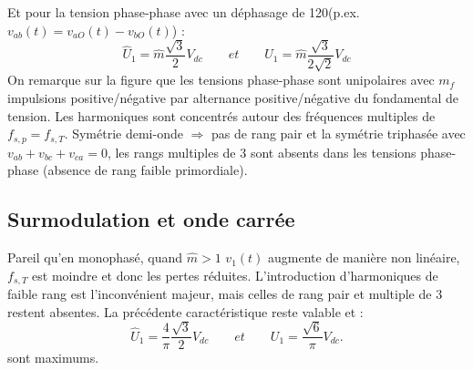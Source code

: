 		Et pour la tension phase-phase avec un déphasage de 120\degres (p.ex. $v_{ab}(t) = v_{aO}(t) - v_{bO}(t)$) :
		\begin{equation}
			\hat{U}_{1} = \hat{m}\frac{\sqrt{3}}{2}V_{dc}\qquad et \qquad U_{1} = \hat{m}\frac{\sqrt{3}}{2\sqrt{2}}V_{dc}
		\end{equation}
		On remarque sur la figure que les tensions phase-phase sont unipolaires avec $m_f$ impulsions positive/négative par alternance positive/négative du fondamental de tension. Les harmoniques sont concentrés autour des fréquences multiples de $f_{s,p} =f_{s,T}$. Symétrie demi-onde $\Rightarrow$ pas de rang pair et la symétrie triphasée avec $v_{ab} + v_{bc} + v_{ca} = 0$, les rangs multiples de 3 sont absents dans les tensions phase-phase (absence de rang faible primordiale). 
		
	\subsection{Surmodulation et onde carrée}
		Pareil qu'en monophasé, quand $\hat{m}>1$ $v_1(t)$ augmente de manière non linéaire, $f_{s,T}$ est moindre et donc les pertes réduites. L'introduction d'harmoniques de faible rang est l'inconvénient majeur, mais celles de rang pair et multiple de 3 restent absentes. La précédente caractéristique reste valable et :
		\begin{equation}
			\hat{U}_1 = \frac{4}{\pi}\frac{\sqrt{3}}{2}V_{dc}\qquad et \qquad U_1 = \frac{\sqrt{6}}{\pi}V_{dc}.
		\end{equation}
		sont maximums.
		
